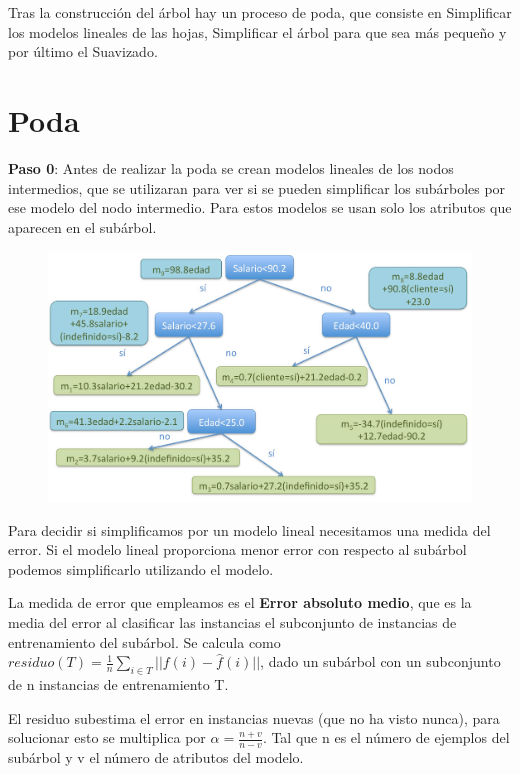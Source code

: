 \documentclass[12pt]{report} %
\begin{document}
Tras la construcción del árbol hay un proceso de poda, que consiste en
Simplificar los modelos lineales de las hojas, Simplificar el árbol para
que sea más pequeño y por último el Suavizado.
\newpage
\section{Poda}

\textbf{Paso 0}: Antes de realizar la poda se crean modelos lineales de los nodos
intermedios, que se utilizaran para ver si se pueden simplificar los
subárboles por ese modelo del nodo intermedio. Para estos modelos se
usan solo los atributos que aparecen en el subárbol.

\begin{figure}[H]
	{\includegraphics[scale=.15]{image-20210312090434196.png}}
\end{figure}

Para decidir si simplificamos por un modelo lineal necesitamos una
medida del error. Si el modelo lineal proporciona menor error con
respecto al subárbol podemos simplificarlo utilizando el modelo.

La medida de error que empleamos es el \textbf{Error absoluto medio},
que es la media del error al clasificar las instancias el subconjunto de
instancias de entrenamiento del subárbol. Se calcula como $residuo(T) = \frac 1 n \sum _{i \in T} ||f(i)- \hat{f}(i)||$, dado un
subárbol con un subconjunto de n instancias de entrenamiento T.

El residuo subestima el error en instancias nuevas (que no ha visto
nunca), para solucionar esto se multiplica por
\(\alpha = \frac {n+v}{n-v}\). Tal que n es el número de ejemplos del
subárbol y v el número de atributos del modelo.
\end{document}

